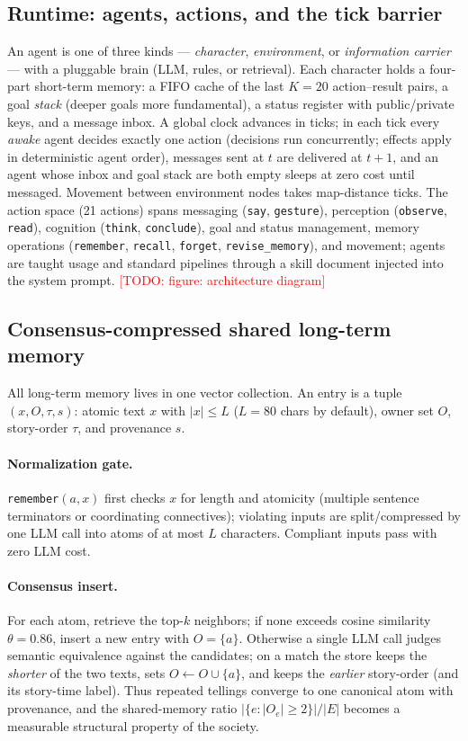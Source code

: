 \documentclass[11pt]{article}
\newcommand{\todo}[1]{\textcolor{red}{[TODO: #1]}}
\begin{document}
\subsection{Runtime: agents, actions, and the tick barrier}
\label{sec:runtime}
An agent is one of three kinds --- \emph{character}, \emph{environment}, or
\emph{information carrier} --- with a pluggable brain (LLM, rules, or
retrieval). Each character holds a four-part short-term memory: a FIFO cache of
the last $K{=}20$ action--result pairs, a goal \emph{stack} (deeper goals more
fundamental), a status register with public/private keys, and a message inbox.
A global clock advances in ticks; in each tick every \emph{awake} agent decides
exactly one action (decisions run concurrently; effects apply in deterministic
agent order), messages sent at $t$ are delivered at $t{+}1$, and an agent whose
inbox and goal stack are both empty sleeps at zero cost until messaged.
Movement between environment nodes takes map-distance ticks. The action space
(21 actions) spans messaging (\texttt{say}, \texttt{gesture}), perception
(\texttt{observe}, \texttt{read}), cognition (\texttt{think},
\texttt{conclude}), goal and status management, memory operations
(\texttt{remember}, \texttt{recall}, \texttt{forget},
\texttt{revise\_memory}), and movement; agents are taught usage and standard
pipelines through a skill document injected into the system prompt.
\todo{figure: architecture diagram}

\subsection{Consensus-compressed shared long-term memory}
\label{sec:memory}
All long-term memory lives in one vector collection. An entry is a tuple
$(x, O, \tau, s)$: atomic text $x$ with $|x|\le L$ ($L{=}80$ chars by default),
owner set $O$, story-order $\tau$, and provenance $s$.

\paragraph{Normalization gate.} \texttt{remember}$(a, x)$ first checks $x$ for
length and atomicity (multiple sentence terminators or coordinating
connectives); violating inputs are split/compressed by one LLM call into atoms
of at most $L$ characters. Compliant inputs pass with zero LLM cost.

\paragraph{Consensus insert.} For each atom, retrieve the top-$k$ neighbors; if
none exceeds cosine similarity $\theta{=}0.86$, insert a new entry with
$O{=}\{a\}$. Otherwise a single LLM call judges semantic equivalence against
the candidates; on a match the store keeps the \emph{shorter} of the two
texts, sets $O \leftarrow O \cup \{a\}$, and keeps the \emph{earlier}
story-order (and its story-time label). Thus repeated tellings converge to one
canonical atom with provenance, and the shared-memory ratio
$|\{e : |O_e|\ge 2\}| / |E|$ becomes a measurable structural property of the
society.
\end{document}
